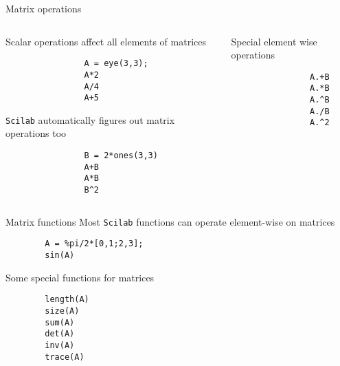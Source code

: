 \documentclass[%
    10pt,
    xcolor={dvipsnames},
    handout,
]{beamer}
\newcommand{\scilab}{\texttt{Scilab}}
\begin{document}
\begin{frame}[fragile]{Matrix operations}
    \begin{columns}
        \begin{column}{0.49\linewidth}
            Scalar operations affect all elements of matrices
            \begin{lstlisting}
                A = eye(3,3);
                A*2
                A/4
                A+5
            \end{lstlisting}
            \scilab{} automatically figures out matrix operations too
            \begin{lstlisting}
                B = 2*ones(3,3)
                A+B
                A*B
                B^2
            \end{lstlisting}
        \end{column}
        \begin{column}{0.49\linewidth}
            Special element wise operations
            \begin{lstlisting}
                A.+B
                A.*B
                A.^B
                A./B
                A.^2
            \end{lstlisting}
        \end{column}
    \end{columns}
\end{frame}

\begin{frame}[fragile]{Matrix functions}
    Most \scilab{} functions can operate element-wise on matrices
    \begin{lstlisting}
        A = %pi/2*[0,1;2,3];
        sin(A)
    \end{lstlisting}
    Some special functions for matrices
    \begin{lstlisting}
        length(A)
        size(A)
        sum(A)
        det(A)
        inv(A)
        trace(A)
    \end{lstlisting}
\end{frame}
\end{document}
